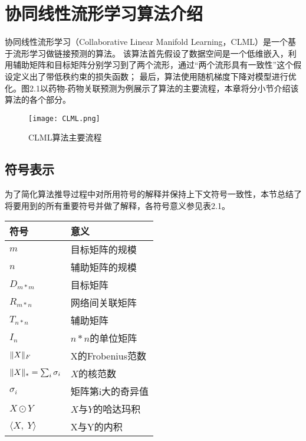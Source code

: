 
\chapter{协同线性流形学习算法介绍}
\label{chpt:method}
协同线性流形学习（Collaborative Linear Manifold Learning，CLML）是一个基于流形学习做链接预测的算法。
该算法首先假设了数据空间是一个低维嵌入，利用辅助矩阵和目标矩阵分别学习到了两个流形，通过“两个流形具有一致性”这个假设定义出了带低秩约束的损失函数；
最后，算法使用随机梯度下降对模型进行优化。图2.1以药物-药物关联预测为例展示了算法的主要流程，本章将分小节介绍该算法的各个部分。

\begin{figure} 
  \centering
  \texttt{[image: CLML.png]}
  \caption{ CLML算法主要流程}
  \label{method:fig:CLML}
\end{figure} 


\section{符号表示}
\label{method:sec:notations}

为了简化算法推导过程中对所用符号的解释并保持上下文符号一致性，本节总结了将要用到的所有重要符号并做了解释，各符号意义参见表2.1。

\begin{center}
    \label{method:table:notations}
\begin{tabular}{l|l} \hline
    符号 & 意义 \\ \hline
    $m$         & 目标矩阵的规模 \\
    $n$         & 辅助矩阵的规模 \\
    $D_{m*m}$   & 目标矩阵 \\
    $R_{m*n}$   & 网络间关联矩阵 \\
    $T_{n*n}$   & 辅助矩阵 \\
    $I_n$       & $n*n$的单位矩阵 \\
    $\Arrowvert{X}\Arrowvert_{F}$ & X的Frobenius范数 \\
    $\Arrowvert{X}\Arrowvert_{*}=\sum_{i}\sigma_i$ & $X$的核范数 \\
    $\sigma_i$  & 矩阵第i大的奇异值 \\
    $X\odot{Y}$ & $X$与$Y$的哈达玛积 \\
    $\langle{X},\ Y\rangle$ & X与Y的内积 \\ \hline

\end{tabular}
\end{center}

